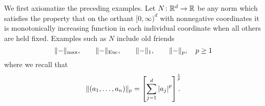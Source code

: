 We first axiomatize the preceding examples. Let \(N\colon\mathbb{R}^d\to\mathbb{R}\) be
any norm which satisfies the property that on the orthant \([0,\infty)^d\)
with nonnegative coordinates it is monotonically increasing function in
each individual coordinate when all others are held fixed. Examples such as
\(N\) include old friends
\[
  \|{-}\|_{\text{max}},\qquad
  \|{-}\|_{\text{Euc}},\qquad
  \|{-}\|_1,\qquad
  \|{-}\|_p,\quad p\geq 1
\]
where we recall that
\[
\|(a_1,\dotsc,a_n)\|_p=\left[\sum_{j=1}^d {|a_j|}^p\right]^{\mathrlap{\frac{1}{p}}}.
\]

